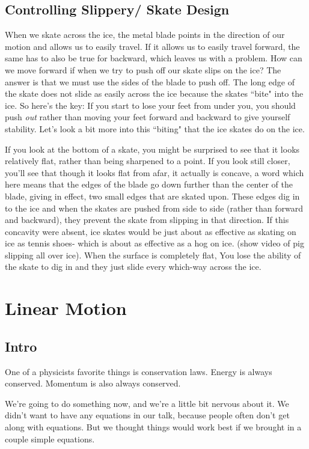 \documentclass[12pt]{article}
\begin{document}
\subsection{Controlling Slippery/ Skate Design}
When we skate across the ice, the metal blade
points in the direction of our motion and allows us to easily travel. 
If it allows us to easily travel forward, the same has to also be true 
for backward, which leaves us with a problem. 
How can we move forward if when we try to push off our skate slips 
on the ice? The answer
is that we must use the sides of the blade to push off. The long
edge of the skate does not slide as easily across the ice because the
skates ``bite" into the ice. So here's the key:
If you start to lose your feet from under you,
you should push \emph{out} rather than moving your feet forward and 
backward to 
give yourself stability. Let's look a bit more into this ``biting" that
the ice skates do on the ice. 

If you look at the bottom of a skate, you might be surprised to see that it looks relatively
flat, rather than being sharpened to a point. If you look still closer, you'll see that 
though it looks flat from afar, it actually is concave, a word which here means that the
edges of the blade go down further than the center of the blade, giving in effect, two small 
edges that are skated upon. These edges dig in to the ice and when the skates are pushed from side
to side (rather than forward and backward), they prevent the skate from slipping in that direction. 
If this concavity were absent, ice skates would be just about as
effective as skating on ice as tennis shoes- which is about as effective as a hog on ice.
(show video of pig slipping all over ice). When the surface is completely flat, 
You lose the ability of the skate to dig in
and they just slide every which-way across the ice. 



\section{Linear Motion}
\subsection{Intro}
One of a physicists favorite things is conservation 
laws. Energy is always conserved. Momentum is also always conserved. 

We're going to do something now, and we're a little bit nervous about it.
We didn't want to have any equations in our talk, because people often 
don't get along with equations. But we thought things would work best 
if we brought in a couple simple equations. 
\end{document}
